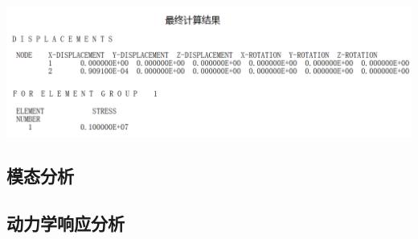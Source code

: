 \documentclass[UTF8]{ctexbook}
\begin{document}
\begin{center}
\includegraphics[width=1.0\textwidth]{plastic6.png}
\end{center}
\subsection{模态分析}


\subsection{动力学响应分析}
\end{document}
